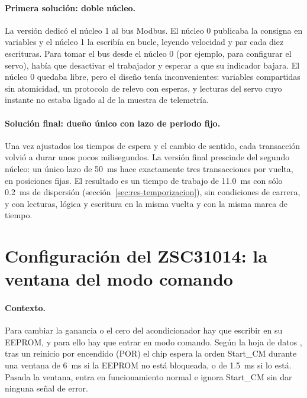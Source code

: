 \paragraph{Primera solución: doble núcleo.} La versión  dedicó el núcleo 1 al bus
Modbus. El núcleo 0 publicaba la consigna en variables  y el núcleo 1 la escribía en
bucle, leyendo velocidad y par cada diez escrituras. Para tomar el bus desde el núcleo 0 (por ejemplo,
para configurar el servo), había que desactivar el trabajador y esperar a que su indicador
 bajara. El núcleo 0 quedaba libre, pero el diseño tenía inconvenientes: variables
compartidas sin atomicidad, un protocolo de relevo con esperas, y lecturas del servo cuyo instante no
estaba ligado al de la muestra de telemetría.

\paragraph{Solución final: dueño único con lazo de periodo fijo.} Una vez ajustados los tiempos de
espera y el cambio de sentido, cada transacción volvió a durar unos pocos milisegundos. La versión
final prescinde del segundo núcleo: un único lazo de \SI{50}{\milli\second} hace exactamente tres
transacciones por vuelta, en posiciones fijas. El resultado es un tiempo de trabajo de
\SI{11.0}{\milli\second} con sólo \SI{0.2}{\milli\second} de dispersión
(sección~\ref{sec:res-temporizacion}), sin condiciones de carrera, y con lecturas, lógica y escritura
en la misma vuelta y con la misma marca de tiempo.

\section{Configuración del ZSC31014: la ventana del modo comando}
\label{sec:prob-zsc}

\paragraph{Contexto.} Para cambiar la ganancia o el cero del acondicionador hay que escribir en su
EEPROM, y para ello hay que entrar en modo comando. Según la hoja de datos \cite{zsc31014}, tras un
reinicio por encendido (POR) el chip espera la orden Start\_CM durante una ventana de \SI{6}{\milli\second}
si la EEPROM no está bloqueada, o de \SI{1.5}{\milli\second} si lo está. Pasada la ventana, entra en
funcionamiento normal e ignora Start\_CM sin dar ninguna señal de error.

